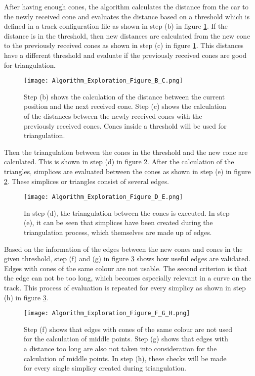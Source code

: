 After having enough cones, the algorithm calculates the distance from the car to the newly received cone and evaluates the distance based on a threshold which is defined in a track configuration file as shown in step (b) in figure \ref{fig:Algorithm Exploration Figure B and C}. If the distance is in the threshold, then new distances are calculated from the new cone to the previously received cones as shown in step (c) in figure \ref{fig:Algorithm Exploration Figure B and C}. This distances have a different threshold and evaluate if the previously received cones are good for triangulation.
\begin{figure}[H]
    \centering
    \texttt{[image: Algorithm\_Exploration\_Figure\_B\_C.png]}
    \caption{Step (b) shows the calculation of the distance between the current position and the next received cone. Step (c) shows the calculation of the distances between the newly received cones with the previously received cones. Cones inside a threshold will be used for triangulation.}
    \label{fig:Algorithm Exploration Figure B and C}
\end{figure}

Then the triangulation between the cones in the threshold and the new cone are calculated. This is shown in step (d) in figure \ref{fig:Algorithm Exploration Figure D and E}. After the calculation of the triangles, simplices are evaluated between the cones as shown in step (e) in figure \ref{fig:Algorithm Exploration Figure D and E}. These simplices or triangles consist of several edges.
\begin{figure}[H]
    \centering
    \texttt{[image: Algorithm\_Exploration\_Figure\_D\_E.png]}
    \caption{In step (d), the triangulation between the cones is executed. In step (e), it can be seen that simplices have been created during the triangulation process, which themselves are made up of edges.}
    \label{fig:Algorithm Exploration Figure D and E}
\end{figure}

Based on the information of the edges between the new cones and cones in the given threshold, step (f) and (g) in figure \ref{fig:Algorithm Exploration Figure F, G and H} shows how useful edges are validated. Edges with cones of the same colour are not usable. The second criterion is that the edge can not be too long, which becomes especially relevant in a curve on the track. This process of evaluation is repeated for every simplicy as shown in step (h) in figure \ref{fig:Algorithm Exploration Figure F, G and H}.
\begin{figure}[H]
    \centering
    \texttt{[image: Algorithm\_Exploration\_Figure\_F\_G\_H.png]}
    \caption{Step (f) shows that edges with cones of the same colour are not used for the calculation of middle points. Step (g) shows that edges with a distance too long are also not taken into consideration for the calculation of middle points. In step (h), these checks will be made for every single simplicy created during triangulation.}
    \label{fig:Algorithm Exploration Figure F, G and H}
\end{figure}

